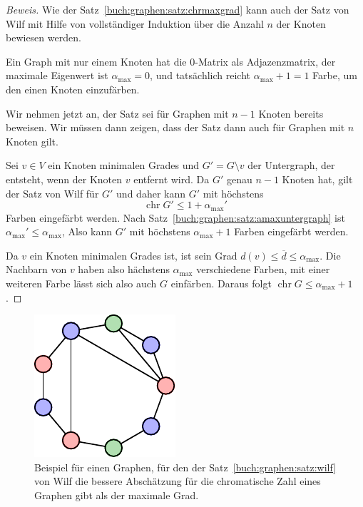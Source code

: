 \begin{proof}[Beweis]
Wie der Satz~\ref{buch:graphen:satz:chrmaxgrad} kann auch der Satz von Wilf
mit Hilfe von vollständiger Induktion über die Anzahl $n$ der Knoten
bewiesen werden.

Ein Graph mit nur einem Knoten hat die $0$-Matrix als Adjazenzmatrix,
der maximale Eigenwert ist $\alpha_{\text{max}}=0$, und tatsächlich reicht
$\alpha_{\text{max}}+1=1$ Farbe, um den einen Knoten einzufärben.

Wir nehmen jetzt an, der Satz sei für Graphen mit $n-1$ Knoten bereits
beweisen.
Wir müssen dann zeigen, dass der Satz dann auch für Graphen mit $n$ Knoten
gilt.

Sei $v\in V$ ein Knoten minimalen Grades und $G'=G\setminus{v}$ der
Untergraph, der entsteht, wenn der Knoten $v$ entfernt wird.
Da $G'$ genau $n-1$ Knoten hat, gilt der Satz von Wilf für $G'$
und daher kann $G'$ mit höchstens
\[
\operatorname{chr}G' \le 1 + \alpha_{\text{max}}'
\]
Farben eingefärbt werden.
Nach Satz~\ref{buch:graphen:satz:amaxuntergraph} ist
$\alpha_{\text{max}}'\le \alpha_{\text{max}}$,
Also kann $G'$ mit höchstens $\alpha_{\text{max}}+1$ Farben eingefärbt werden.

Da $v$ ein Knoten minimalen Grades ist, ist sein Grad
$d(v)\le \overline{d}\le \alpha_{\text{max}}$.
Die Nachbarn von $v$ haben also hächstens $\alpha_{\text{max}}$ verschiedene
Farben, mit einer weiteren Farbe lässt sich also auch $G$ einfärben.
Daraus folgt $\operatorname{chr}G\le \alpha_{\text{max}}+1$.
\end{proof}

\begin{figure}
\centering
\includegraphics{chapters/70-graphen/images/nine.pdf}
\caption{Beispiel für einen Graphen, für den der
Satz~\ref{buch:graphen:satz:wilf} von Wilf die bessere
Abschätzung für die chromatische Zahl eines Graphen gibt als der
maximale Grad.
\label{buch:graphen:fig:wilfexample}}
\end{figure}

